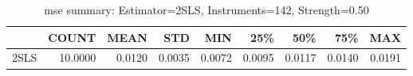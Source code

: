 \begin{table}[ht]
\centering
\caption{mse summary: Estimator=2SLS, Instruments=142, Strength=0.50}
\begin{tabular}{lrrrrrrrr}
\toprule
 & COUNT & MEAN & STD & MIN & 25\% & 50\% & 75\% & MAX \\
\midrule
2SLS & 10.0000 & 0.0120 & 0.0035 & 0.0072 & 0.0095 & 0.0117 & 0.0140 & 0.0191 \\
\bottomrule
\end{tabular}
\end{table}
